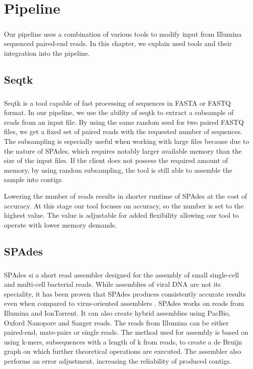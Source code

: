 \chapter{Pipeline}

\label{kap:pipeline} %
\paragraph*{}
Our pipeline uses a combination of various tools to modify input from Illumina sequenced paired-end reads. In this chapter, we explain used tools and their integration into the pipeline. 
\section{Seqtk}
\paragraph*{}
Seqtk\cite{li2012seqtk} is a tool capable of fast processing of sequences in FASTA or FASTQ format. In our pipeline, we use the ability of seqtk to extract a subsample of reads from an input file. By using the same random seed for two paired FASTQ files, we get a fixed set of paired reads with the requested number of sequences. The subsampling is especially useful when working with large files because due to the nature of SPAdes, which requires notably larger available memory than the size of the input files. If the client does not possess the required amount of memory, by using random subsampling, the tool is still able to assemble the sample into contigs. 

Lowering the number of reads results in shorter runtime of SPAdes at the cost of accuracy. At this stage our tool focuses on accuracy, so the number is set to the highest value. The value is adjustable for added flexibility allowing our tool to operate with lower memory demands.

\section{SPAdes}
\paragraph*{}
SPAdes\cite{bankevich2012spades} si a short read assembler designed for the assembly of small single-cell and multi-cell bacterial reads. While assemblies of viral DNA are not its speciality, it has been proven that SPAdes produces consistently accurate results even when compared to virus-oriented assemblers \cite{sutton2019choice}. SPAdes works on reads from Illumina and IonTorrent. It can also create hybrid assemblies using PacBio, Oxford Nanopore and Sanger reads. The reads from Illumina can be either paired-end, mate-pairs or single reads. The method used for assembly is based on using k-mers, subsequences with a length of k from reads, to create a de Bruijn graph on which further theoretical operations are executed. The assembler also performs an error adjustment, increasing the reliability of produced contigs.
